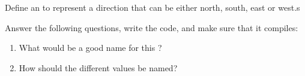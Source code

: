 Define an  to represent a direction that can be either north, south, east or west.s

Answer the following questions, write the code, and make sure that it compiles:
\begin{enumerate}
  \item What would be a good name for this ?
  \item How should the different values be named?
\end{enumerate}
